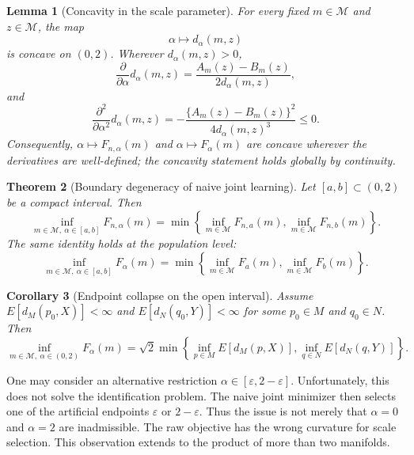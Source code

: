 \documentclass[11pt]{article}
\newtheorem{theorem}{Theorem}
\newtheorem{lemma}[theorem]{Lemma}
\newtheorem{corollary}[theorem]{Corollary}
\newcommand{\M}{\mathcal M}
\newcommand{\eps}{\varepsilon}
\newcommand{\1}{\mathbf{1}}
\begin{document}
\begin{lemma}[Concavity in the scale parameter]\label{lem:concavity}
For every fixed $m\in\M$ and $z\in\M$, the map
\[
 \alpha\mapsto d_\alpha(m,z)
\]
is concave on $(0,2)$.  Wherever $d_\alpha(m,z)>0$,
\[
 \frac{\partial}{\partial\alpha}d_\alpha(m,z)
 =\frac{A_m(z)-B_m(z)}{2d_\alpha(m,z)},
\]
and
\[
 \frac{\partial^2}{\partial\alpha^2}d_\alpha(m,z)
 =-\frac{\{A_m(z)-B_m(z)\}^2}{4d_\alpha(m,z)^3}\le0.
\]
Consequently, $\alpha\mapsto F_{n,\alpha}(m)$ and $\alpha\mapsto F_\alpha(m)$ are concave wherever the derivatives are well-defined; the concavity statement holds globally by continuity.
\end{lemma}


\begin{theorem}[Boundary degeneracy of naive joint learning]\label{thm:boundary-degeneracy}
Let $[a,b]\subset(0,2)$ be a compact interval.  Then
\begin{equation}\label{eq:emp-boundary-degeneracy}
 \inf_{m\in\M,\ \alpha\in[a,b]}F_{n,\alpha}(m)
 =
 \min\left\{
 \inf_{m\in\M}F_{n,a}(m),
 \inf_{m\in\M}F_{n,b}(m)
 \right\}.
\end{equation}
The same identity holds at the population level:
\begin{equation}\label{eq:pop-boundary-degeneracy}
 \inf_{m\in\M,\ \alpha\in[a,b]}F_\alpha(m)
 =
 \min\left\{
 \inf_{m\in\M}F_a(m),
 \inf_{m\in\M}F_b(m)
 \right\}.
\end{equation}
\end{theorem}



\begin{corollary}[Endpoint collapse on the open interval]\label{cor:endpoint-collapse}
Assume $E[d_M(p_0,X)]<\infty$ and $E[d_N(q_0,Y)]<\infty$ for some $p_0\in M$ and $q_0\in N$.  Then
\begin{equation}\label{eq:endpoint-collapse}
 \inf_{m\in\M,\ \alpha\in(0,2)}F_\alpha(m)
 =
 \sqrt2\min\left\{
 \inf_{p\in M}E[d_M(p,X)],
 \inf_{q\in N}E[d_N(q,Y)]
 \right\}.
\end{equation}
\end{corollary}

One may consider an alternative restriction  $\alpha\in[\eps,2-\eps]$.  Unfortunately, this does not solve the identification problem.  The naive joint minimizer then selects one of the artificial endpoints $\eps$ or $2-\eps$.  Thus the issue is not merely that $\alpha=0$ and $\alpha=2$ are inadmissible.  The raw objective has the wrong curvature for scale selection. This observation extends to the product of more than two manifolds. 
\end{document}

